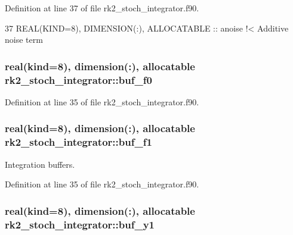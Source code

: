 Definition at line 37 of file rk2\+\_\+stoch\+\_\+integrator.\+f90.


\begin{DoxyCode}
37   \textcolor{keywordtype}{REAL(KIND=8)}, \textcolor{keywordtype}{DIMENSION(:)}, \textcolor{keywordtype}{ALLOCATABLE} :: anoise\textcolor{comment}{ !< Additive noise term}
\end{DoxyCode}
\subsubsection[{\texorpdfstring{buf\+\_\+f0}{buf_f0}}]{\setlength{\rightskip}{0pt plus 5cm}real(kind=8), dimension(\+:), allocatable rk2\+\_\+stoch\+\_\+integrator\+::buf\+\_\+f0\hspace{0.3cm}{\ttfamily [private]}}\hypertarget{namespacerk2__stoch__integrator_a3dbdf4830785d5db95d610433de2d0bd}{}\label{namespacerk2__stoch__integrator_a3dbdf4830785d5db95d610433de2d0bd}


Definition at line 35 of file rk2\+\_\+stoch\+\_\+integrator.\+f90.

\subsubsection[{\texorpdfstring{buf\+\_\+f1}{buf_f1}}]{\setlength{\rightskip}{0pt plus 5cm}real(kind=8), dimension(\+:), allocatable rk2\+\_\+stoch\+\_\+integrator\+::buf\+\_\+f1\hspace{0.3cm}{\ttfamily [private]}}\hypertarget{namespacerk2__stoch__integrator_aea615b16fd861e4ccb1f26c4ee64df85}{}\label{namespacerk2__stoch__integrator_aea615b16fd861e4ccb1f26c4ee64df85}


Integration buffers. 



Definition at line 35 of file rk2\+\_\+stoch\+\_\+integrator.\+f90.

\subsubsection[{\texorpdfstring{buf\+\_\+y1}{buf_y1}}]{\setlength{\rightskip}{0pt plus 5cm}real(kind=8), dimension(\+:), allocatable rk2\+\_\+stoch\+\_\+integrator\+::buf\+\_\+y1\hspace{0.3cm}{\ttfamily [private]}}\hypertarget{namespacerk2__stoch__integrator_a549cd39d4971e7b9268a4beb079feb80}{}\label{namespacerk2__stoch__integrator_a549cd39d4971e7b9268a4beb079feb80}


